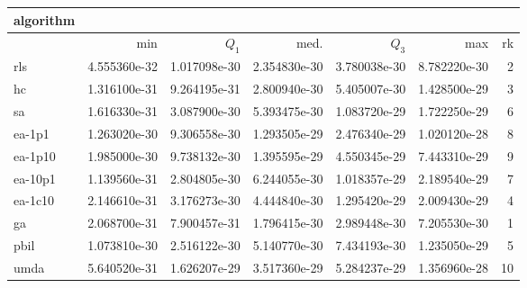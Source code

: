 \begin{tabular}{@{}l*{5}{>{{}}N{1}{1}}>{{}}N{2}{0}@{}}
\toprule
{algorithm} &  \\
\midrule
& {min} & {$Q_1$} & {med.} & {$Q_3$} & {max} & {rk}\\
\midrule
rls & {\color{blue}} 4.555360e-32 & 1.017098e-30 & 2.354830e-30 & 3.780038e-30 & 8.782220e-30 & 2\\
hc & 1.316100e-31 & 9.264195e-31 & 2.800940e-30 & 5.405007e-30 & 1.428500e-29 & 3\\
sa & 1.616330e-31 & 3.087900e-30 & 5.393475e-30 & 1.083720e-29 & 1.722250e-29 & 6\\
ea-1p1 & 1.263020e-30 & 9.306558e-30 & 1.293505e-29 & 2.476340e-29 & 1.020120e-28 & 8\\
ea-1p10 & 1.985000e-30 & 9.738132e-30 & 1.395595e-29 & 4.550345e-29 & 7.443310e-29 & 9\\
ea-10p1 & 1.139560e-31 & 2.804805e-30 & 6.244055e-30 & 1.018357e-29 & 2.189540e-29 & 7\\
ea-1c10 & 2.146610e-31 & 3.176273e-30 & 4.444840e-30 & 1.295420e-29 & 2.009430e-29 & 4\\
ga & 2.068700e-31 & {\color{blue}} 7.900457e-31 & {\color{blue}} 1.796415e-30 & {\color{blue}} 2.989448e-30 & {\color{blue}} 7.205530e-30 & 1\\
pbil & 1.073810e-30 & 2.516122e-30 & 5.140770e-30 & 7.434193e-30 & 1.235050e-29 & 5\\
umda & 5.640520e-31 & 1.626207e-29 & 3.517360e-29 & 5.284237e-29 & 1.356960e-28 & 10\\
\bottomrule
\end{tabular}
